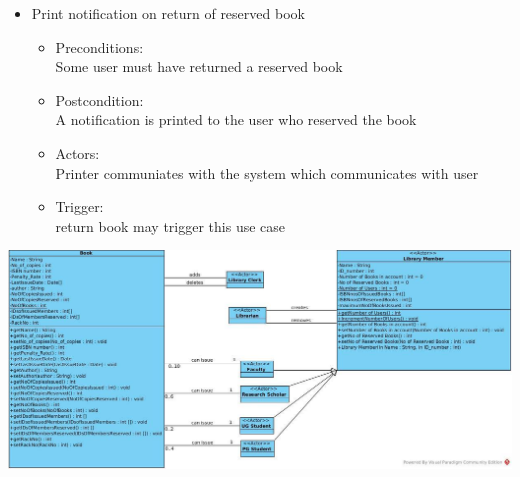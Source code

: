 \documentclass{article}
\begin{document}
\begin{enumerate}
\begin{itemize}
\item Print notification on return of reserved book\\ 
\begin{itemize}
\item Preconditions:\\ Some user must have returned a reserved book \\ 
 \item Postcondition:\\ A notification is printed to the user who reserved the book\\ 
 \item Actors: \\ Printer communiates with the system which communicates with user\\ 
 \item Trigger:\\ return book may trigger this use case\\ 
\end{itemize}

\end{itemize}
\end{enumerate}
\includegraphics[scale=0.25]{images/classDiagram}
\\
\end{document}

